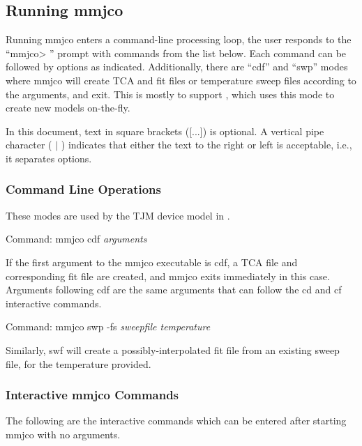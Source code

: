 \subsection{Running {\vt mmjco}}

Running {\vt mmjco} enters a command-line processing loop, the user
responds to the ``{\vt mmjco> }'' prompt with commands from the list
below.  Each command can be followed by options as indicated. 
Additionally, there are ``{\vt cdf}'' and ``{\vt swp}'' modes where
{\vt mmjco} will create TCA and fit files or temperature sweep files
according to the arguments, and exit.  This is mostly to support
{\WRspice}, which uses this mode to create new models on-the-fly.

In this document, text in square brackets ([...]) is optional.  A
vertical pipe character ( $|$ ) indicates that either the text to the
right or left is acceptable, i.e., it separates options.

\subsubsection{Command Line Operations}

These modes are used by the TJM device model in {\WRspice}.

Command:  {\vt mmjco cdf} {\it arguments}

If the first argument to the {\vt mmjco} executable is {\vt cdf}, a
TCA file and corresponding fit file are created, and {\vt mmjco} exits
immediately in this case.  Arguments following {\vt cdf} are the same
arguments that can follow the {\vt cd} and {\vt cf} interactive
commands.

Command:  {\vt mmjco swp -fs} {\it sweepfile temperature}

Similarly, {\vt swf} will create a possibly-interpolated fit file from
an existing sweep file, for the temperature provided.

\subsubsection{Interactive {\vt mmjco} Commands}

The following are the interactive commands which can be entered after
starting {\vt mmjco} with no arguments.

